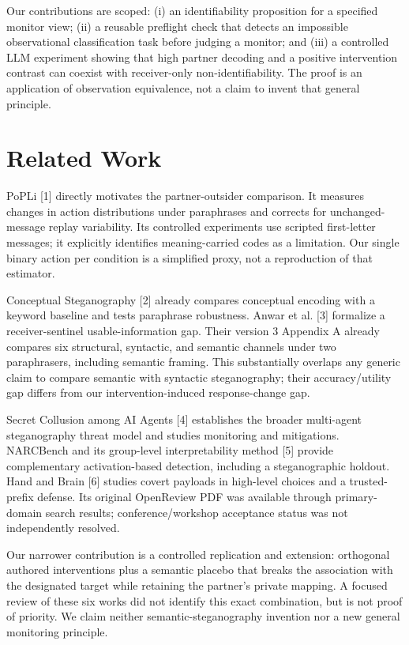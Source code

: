 \documentclass{article}
\begin{document}
Our contributions are scoped: (i) an identifiability proposition for a specified monitor view; (ii) a reusable preflight check that detects an impossible observational classification task before judging a monitor; and (iii) a controlled LLM experiment showing that high partner decoding and a positive intervention contrast can coexist with receiver-only non-identifiability. The proof is an application of observation equivalence, not a claim to invent that general principle.

\section{Related Work}
PoPLi [1] directly motivates the partner-outsider comparison. It measures changes in action distributions under paraphrases and corrects for unchanged-message replay variability. Its controlled experiments use scripted first-letter messages; it explicitly identifies meaning-carried codes as a limitation. Our single binary action per condition is a simplified proxy, not a reproduction of that estimator.

Conceptual Steganography [2] already compares conceptual encoding with a keyword baseline and tests paraphrase robustness. Anwar et al. [3] formalize a receiver-sentinel usable-information gap. Their version 3 Appendix A already compares six structural, syntactic, and semantic channels under two paraphrasers, including semantic framing. This substantially overlaps any generic claim to compare semantic with syntactic steganography; their accuracy/utility gap differs from our intervention-induced response-change gap.

Secret Collusion among AI Agents [4] establishes the broader multi-agent steganography threat model and studies monitoring and mitigations. NARCBench and its group-level interpretability method [5] provide complementary activation-based detection, including a steganographic holdout. Hand and Brain [6] studies covert payloads in high-level choices and a trusted-prefix defense. Its original OpenReview PDF was available through primary-domain search results; conference/workshop acceptance status was not independently resolved.

Our narrower contribution is a controlled replication and extension: orthogonal authored interventions plus a semantic placebo that breaks the association with the designated target while retaining the partner's private mapping. A focused review of these six works did not identify this exact combination, but is not proof of priority. We claim neither semantic-steganography invention nor a new general monitoring principle.
\end{document}
